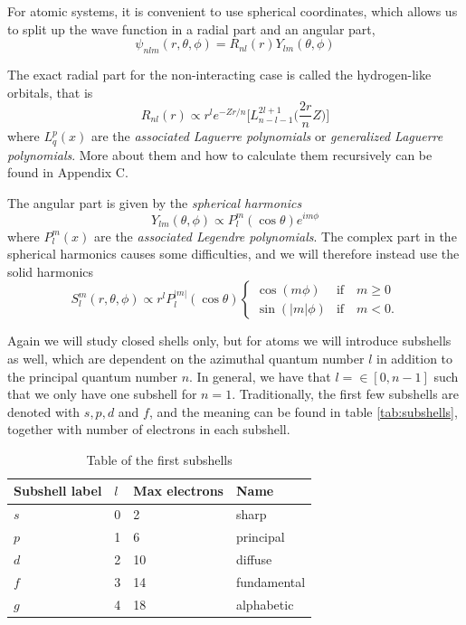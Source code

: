 For atomic systems, it is convenient to use spherical coordinates, which allows us to split up the wave function in a radial part and an angular part,
\begin{equation}
\psi_{nlm}(r,\theta,\phi)=R_{nl}(r)Y_{lm}(\theta,\phi)
\end{equation}

The exact radial part for the non-interacting case is called the hydrogen-like orbitals, that is
\begin{equation}
R_{nl}(r)\propto r^le^{-Zr/n}\Big[L_{n-l-1}^{2l+1}\Big(\frac{2r}{n}Z\Big)\Big]
\end{equation}
where $L_{q}^p(x)$ are the \textit{associated Laguerre polynomials} or \textit{generalized Laguerre polynomials}. More about them and how to calculate them recursively can be found in Appendix C. 

The angular part is given by the \textit{spherical harmonics}
\begin{equation}
Y_{lm}(\theta,\phi)\propto P_l^m(\cos\theta)e^{im\phi}
\end{equation}
where $P_l^m(x)$ are the \textit{associated Legendre polynomials}. The complex part in the spherical harmonics causes some difficulties, and we will therefore instead use the solid harmonics
\begin{equation}
\label{eq:V_ext}
S_l^m(r,\theta,\phi)\propto r^lP_l^{|m|}(\cos\theta)
\begin{cases} 
\cos(m\phi) & \text{if} \quad m\geq0 \\
\sin(|m|\phi) & \text{if} \quad m<0.
\end{cases}
\end{equation}

Again we will study closed shells only, but for atoms we will introduce subshells as well, which are dependent on the azimuthal quantum number $l$ in addition to the principal quantum number $n$. In general, we have that $l=\in [0,n-1]$ such that we only have one subshell for $n=1$. Traditionally, the first few subshells are denoted with $s, p, d$ and $f$, and the meaning can be found in table \eqref{tab:subshells}, together with number of electrons in each subshell.

\begin{table} [H]
	\caption{Table of the first subshells  \vspace{2mm}}
	\begin{tabularx}{\textwidth}{X|X:X:X} \hline\hline
		\label{tab:subshells}
		Subshell label & $l$ & Max electrons & Name \\ \hline
		$s$ & 0 & 2 & sharp\\ 
		$p$ & 1 & 6 & principal\\
		$d$ & 2 & 10 & diffuse \\
		$f$ & 3 & 14 & fundamental \\
		$g$ & 4 & 18 & alphabetic \\ \hline\hline
	\end{tabularx}
\end{table}

